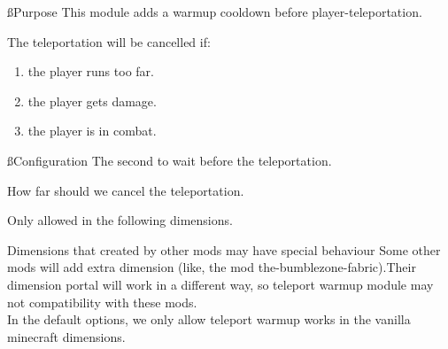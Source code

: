 
\ss{Purpose}
This module adds a warmup cooldown before player-teleportation.

The teleportation will be cancelled if:
\begin{enumerate}
    \item the player runs too far.
    \item the player gets damage.
    \item the player is in combat.
\end{enumerate}

\ss{Configuration}
The second to wait before the teleportation.

How far should we cancel the teleportation.

Only allowed in the following dimensions.

\begin{warn}{Dimensions that created by other mods may have special behaviour}
    Some other mods will add extra dimension (like, the mod the-bumblezone-fabric).Their dimension portal will work in a different way, so teleport warmup module may not compatibility with these mods.
    \\
    In the default options, we only allow teleport warmup works in the vanilla minecraft dimensions.
\end{warn}

